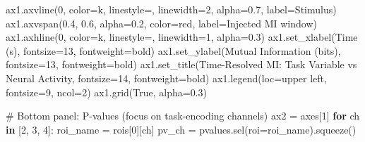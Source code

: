 \documentclass[
  11pt,
  letterpaper,
  oneside,
  openany]{book}
\newenvironment{Shaded}{\begin{snugshade}}{\end{snugshade}}
\newcommand{\CommentTok}[1]{\textcolor[rgb]{0.37,0.37,0.37}{#1}}
\newcommand{\ControlFlowTok}[1]{\textcolor[rgb]{0.00,0.23,0.31}{\textbf{#1}}}
\newcommand{\DecValTok}[1]{\textcolor[rgb]{0.68,0.00,0.00}{#1}}
\newcommand{\FloatTok}[1]{\textcolor[rgb]{0.68,0.00,0.00}{#1}}
\newcommand{\KeywordTok}[1]{\textcolor[rgb]{0.00,0.23,0.31}{\textbf{#1}}}
\newcommand{\NormalTok}[1]{\textcolor[rgb]{0.00,0.23,0.31}{#1}}
\newcommand{\OperatorTok}[1]{\textcolor[rgb]{0.37,0.37,0.37}{#1}}
\newcommand{\StringTok}[1]{\textcolor[rgb]{0.13,0.47,0.30}{#1}}
\newcommand{\VariableTok}[1]{\textcolor[rgb]{0.07,0.07,0.07}{#1}}
\begin{document}
\begin{Shaded}
\begin{Highlighting}[]
\NormalTok{ax1.axvline(}\DecValTok{0}\NormalTok{, color}\OperatorTok{=}\StringTok{\textquotesingle{}k\textquotesingle{}}\NormalTok{, linestyle}\OperatorTok{=}\StringTok{\textquotesingle{}{-}{-}\textquotesingle{}}\NormalTok{, linewidth}\OperatorTok{=}\DecValTok{2}\NormalTok{, alpha}\OperatorTok{=}\FloatTok{0.7}\NormalTok{, label}\OperatorTok{=}\StringTok{\textquotesingle{}Stimulus\textquotesingle{}}\NormalTok{)}
\NormalTok{ax1.axvspan(}\FloatTok{0.4}\NormalTok{, }\FloatTok{0.6}\NormalTok{, alpha}\OperatorTok{=}\FloatTok{0.2}\NormalTok{, color}\OperatorTok{=}\StringTok{\textquotesingle{}red\textquotesingle{}}\NormalTok{, label}\OperatorTok{=}\StringTok{\textquotesingle{}Injected MI window\textquotesingle{}}\NormalTok{)}
\NormalTok{ax1.axhline(}\DecValTok{0}\NormalTok{, color}\OperatorTok{=}\StringTok{\textquotesingle{}k\textquotesingle{}}\NormalTok{, linestyle}\OperatorTok{=}\StringTok{\textquotesingle{}{-}\textquotesingle{}}\NormalTok{, linewidth}\OperatorTok{=}\DecValTok{1}\NormalTok{, alpha}\OperatorTok{=}\FloatTok{0.3}\NormalTok{)}
\NormalTok{ax1.set\_xlabel(}\StringTok{\textquotesingle{}Time (s)\textquotesingle{}}\NormalTok{, fontsize}\OperatorTok{=}\DecValTok{13}\NormalTok{, fontweight}\OperatorTok{=}\StringTok{\textquotesingle{}bold\textquotesingle{}}\NormalTok{)}
\NormalTok{ax1.set\_ylabel(}\StringTok{\textquotesingle{}Mutual Information (bits)\textquotesingle{}}\NormalTok{, fontsize}\OperatorTok{=}\DecValTok{13}\NormalTok{, fontweight}\OperatorTok{=}\StringTok{\textquotesingle{}bold\textquotesingle{}}\NormalTok{)}
\NormalTok{ax1.set\_title(}\StringTok{\textquotesingle{}Time{-}Resolved MI: Task Variable vs Neural Activity\textquotesingle{}}\NormalTok{, }
\NormalTok{              fontsize}\OperatorTok{=}\DecValTok{14}\NormalTok{, fontweight}\OperatorTok{=}\StringTok{\textquotesingle{}bold\textquotesingle{}}\NormalTok{)}
\NormalTok{ax1.legend(loc}\OperatorTok{=}\StringTok{\textquotesingle{}upper left\textquotesingle{}}\NormalTok{, fontsize}\OperatorTok{=}\DecValTok{9}\NormalTok{, ncol}\OperatorTok{=}\DecValTok{2}\NormalTok{)}
\NormalTok{ax1.grid(}\VariableTok{True}\NormalTok{, alpha}\OperatorTok{=}\FloatTok{0.3}\NormalTok{)}

\CommentTok{\# Bottom panel: P{-}values (focus on task{-}encoding channels)}
\NormalTok{ax2 }\OperatorTok{=}\NormalTok{ axes[}\DecValTok{1}\NormalTok{]}
\ControlFlowTok{for}\NormalTok{ ch }\KeywordTok{in}\NormalTok{ [}\DecValTok{2}\NormalTok{, }\DecValTok{3}\NormalTok{, }\DecValTok{4}\NormalTok{]:}
\NormalTok{    roi\_name }\OperatorTok{=}\NormalTok{ rois[}\DecValTok{0}\NormalTok{][ch]}
\NormalTok{    pv\_ch }\OperatorTok{=}\NormalTok{ pvalues.sel(roi}\OperatorTok{=}\NormalTok{roi\_name).squeeze()}
    

\end{Highlighting}
\end{Shaded}
\end{document}
